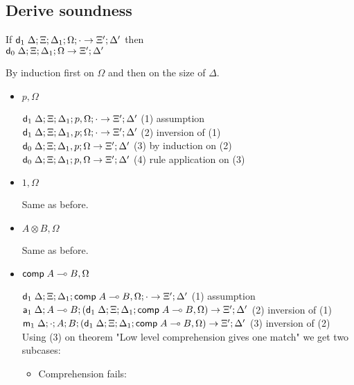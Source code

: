 \documentclass[9pt]{article}
\begin{document}
\subsection{Derive soundness}

If $\mathsf{d}_1 \; \Delta; \Xi; \Delta_1; \Omega; \cdot \rightarrow \Xi'; \Delta'$ then \\
$\mathsf{d}_0 \; \Delta; \Xi; \Delta_1; \Omega \rightarrow \Xi'; \Delta'$

By induction first on $\Omega$ and then on the size of $\Delta$.

\begin{itemize}
\item $p, \Omega$

$\mathsf{d}_1 \; \Delta; \Xi; \Delta_1; p, \Omega; \cdot \rightarrow \Xi'; \Delta'$ \hfill (1) assumption \\
$\mathsf{d}_1 \; \Delta; \Xi; \Delta_1, p; \Omega; \cdot \rightarrow \Xi'; \Delta'$ \hfill (2) inversion of (1) \\
$\mathsf{d}_0 \; \Delta; \Xi; \Delta_1, p; \Omega \rightarrow \Xi'; \Delta'$ \hfill (3) by induction on (2) \\
$\mathsf{d}_0 \; \Delta; \Xi; \Delta_1; p, \Omega \rightarrow \Xi'; \Delta'$ \hfill (4) rule application on (3) \\

\item $1, \Omega$

Same as before.

\item $A \otimes B, \Omega$

Same as before.

\item $\mathsf{comp} \; A \multimap B, \Omega$

$\mathsf{d}_1 \; \Delta; \Xi; \Delta_1; \mathsf{comp} \; A \multimap B, \Omega; \cdot \rightarrow \Xi'; \Delta'$ \hfill (1) assumption \\
$\mathsf{a}_1 \; \Delta; A \multimap B; (\mathsf{d}_1 \; \Delta; \Xi; \Delta_1; \mathsf{comp} \; A \multimap B, \Omega) \rightarrow \Xi'; \Delta'$ \hfill (2) inversion of (1) \\
$\mathsf{m}_1 \; \Delta; \cdot; A; B ; (\mathsf{d}_1 \; \Delta; \Xi; \Delta_1; \mathsf{comp} \; A \multimap B, \Omega) \rightarrow \Xi'; \Delta'$ \hfill (3) inversion of (2) \\
Using (3) on theorem "Low level comprehension gives one match" we get two subcases:

\begin{itemize}
\item Comprehension fails:


\end{itemize}
\end{itemize}
\end{document}

